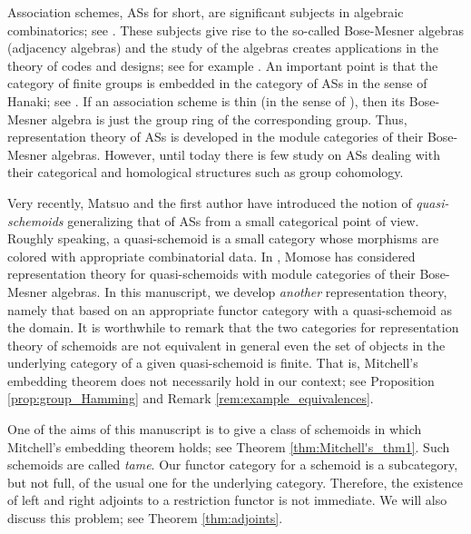 \documentclass{amsart}
\theoremstyle{definition}
\theoremstyle{remark}
\begin{document}
Association schemes, ASs for short, are significant subjects in algebraic combinatorics; see \cite{B-I, D, Z_1995}.  
These subjects give rise to the so-called Bose-Mesner algebras (adjacency algebras) and 
the study of the algebras creates applications in the theory of codes and designs; see for example \cite{P-Z}. 
An important point is that the category of finite groups is embedded in the category of ASs
in the sense of Hanaki; see \cite{Z_book, H, F_1}. If an association scheme is thin (in the sense of \cite{Z_book}), 
then its Bose-Mesner algebra is just the group ring of the corresponding group. Thus, representation theory of ASs 
is developed in the module categories of their Bose-Mesner algebras. 
However, until today there is few study on ASs dealing with their categorical and homological structures such as group cohomology. 

Very recently, Matsuo and the first author \cite{K-M} have introduced the notion of {\it quasi-schemoids} 
generalizing that of ASs from a small categorical point of view.  Roughly speaking, 
a quasi-schemoid is a small category whose morphisms are colored with appropriate combinatorial data. 
In \cite{Momose}, Momose has considered 
representation theory for quasi-schemoids with module categories of their Bose-Mesner algebras. 
In this manuscript, we develop {\it another} representation theory, namely that based on an appropriate 
functor category with a quasi-schemoid as the domain.  
It is worthwhile to remark that the two categories for representation theory 
of schemoids are not equivalent in general even the set of objects 
in the underlying category of a given quasi-schemoid is finite.  That is, Mitchell's embedding theorem does not necessarily hold 
in our context; see Proposition \ref{prop:group_Hamming} and Remark \ref{rem:example_equivalences}. 

One of the aims of this manuscript is to give a class of  schemoids in which Mitchell's embedding theorem holds; 
see Theorem \ref{thm:Mitchell's_thm1}. Such schemoids are called {\it tame}. 
Our functor category for a schemoid is a subcategory, but not full, of the usual one 
for the underlying category. Therefore, the existence of left and right adjoints to a restriction functor is not immediate.  
We will also discuss this problem; see Theorem \ref{thm:adjoints}.  
\end{document}
